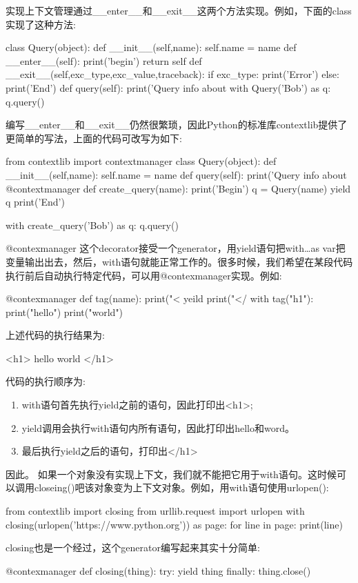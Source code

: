 实现上下文管理通过\_\_enter\_\_和\_\_exit\_\_这两个方法实现。例如，下面的class实现了这种方法:
\begin{python}
class Query(object):
    def __init__(self,name):
        self.name = name
    def __enter__(self):
        print('begin')
        return self
    def __exit__(self,exc_type,exc_value,traceback):
        if exc_type:
            print('Error')
        else:
            print('End')
    def query(self):
        print('Query info about%
with Query('Bob') as q:
    q.query()
\end{python}
编写\_\_enter\_\_和\_\_exit\_\_仍然很繁琐，因此Python的标准库contextlib提供了更简单的写法，上面的代码可改写为如下:
\begin{python}

from contextlib import contextmanager
class Query(object):
    def __init__(self,name):
        self.name = name
    def query(self):
        print('Query info about%
@contextmanager
def create_query(name):
    print('Begin')
    q = Query(name)
    yield q
    print('End')

with create_query('Bob') as q:
    q.query()
\end{python}
@contexmanager 这个decorator接受一个generator，用yield语句把with\ldots as var把变量输出出去，然后，with语句就能正常工作的。很多时候，我们希望在某段代码执行前后自动执行特定代码，可以用@contexmanager实现。例如:
\begin{python}
@contexmanager
def tag(name):
    print("<%
    yeild 
    print("</%
with tag("h1"):
    print("hello")
    print("world")
\end{python}
上述代码的执行结果为:
\begin{python}
<h1>
hello
world
</h1>
\end{python}
代码的执行顺序为:
\begin{enumerate}
	\item with语句首先执行yield之前的语句，因此打印出<h1>;
	\item yield调用会执行with语句内所有语句，因此打印出hello和word。
	\item 最后执行yield之后的语句，打印出</h1>
\end{enumerate}
因此。
\@closing
如果一个对象没有实现上下文，我们就不能把它用于with语句。这时候可以调用closeing()吧该对象变为上下文对象。例如，用with语句使用urlopen():
\begin{python}
from contextlib import closing
from urllib.request import urlopen
with closing(urlopen('https://www.python.org')) as page:
    for line in page:
        print(line)
\end{python}
closing也是一个经过，这个generator编写起来其实十分简单:
\begin{python}
@contexmanager
def closing(thing):
    try:
        yield thing
    finally:
        thing.close()
\end{python}
